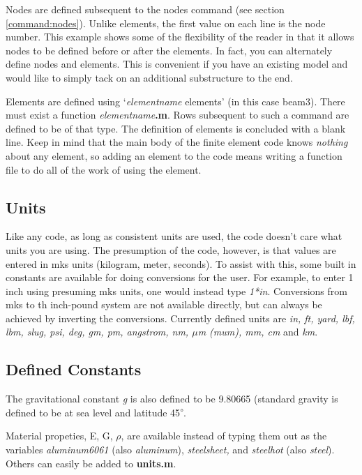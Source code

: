 \documentclass[12pt]{article}
\newcommand*{\sarg}[1]{\textit{#1}}
\newcommand*{\command}[1]{\textsf{#1}}
\newcommand*{\variable}[1]{\textit{#1}}
\newcommand*{\filename}[1]{\textsf{\textbf{#1}}}
\begin{document}
Nodes are defined subsequent to the
\command{nodes} command (see section \ref{command:nodes}). Unlike elements, the first value on each line is the node number. This example shows some of the flexibility of the reader in that it allows nodes to be defined before or after the elements. In fact, you can alternately define nodes and elements. This is convenient if you have an existing model and would like to simply tack on an additional substructure to the end.

Elements are defined using `\sarg{elementname} \command{elements}' (in
this case \command{beam3}). There must exist a function
\sarg{elementname}\filename{.m}. Rows subsequent to such a command are
defined to be of that type. The definition of elements is concluded
with a blank line. Keep in mind that the main body of the finite
element code knows \emph{nothing} about any element, so adding an
element to the code means writing a function file to do all of the
work of using the element.

\subsection{Units}
Like any code, as long as consistent units are used, the code doesn't care what units you are using. The presumption of the code, however, is that values are entered in mks units (kilogram, meter, seconds). To assist with this, some built in constants are available for doing conversions for the user. For example, to enter 1 inch  using presuming mks units, one would instead type \variable{1*in}. Conversions from mks to th inch-pound system are not available directly, but can always be achieved by inverting the conversions. Currently defined units are \variable{in, ft, yard, lbf, lbm, slug, psi, deg, gm, pm, angstrom, nm, $\mu$m (mum), mm, cm} and \variable{km}.

\subsection{Defined Constants}
The gravitational constant \variable{g} is also defined to be 9.80665 (standard gravity is defined to be at sea level and latitude 45\textsuperscript{$\circ$}. 

Material propeties, E, G, $\rho$, are available instead of typing them out as the variables \variable{aluminum6061} (also \variable{aluminum}), \variable{steelsheet,} and \variable{steelhot} (also \variable{steel}). Others can easily be added to \filename{units.m}.
\end{document}
